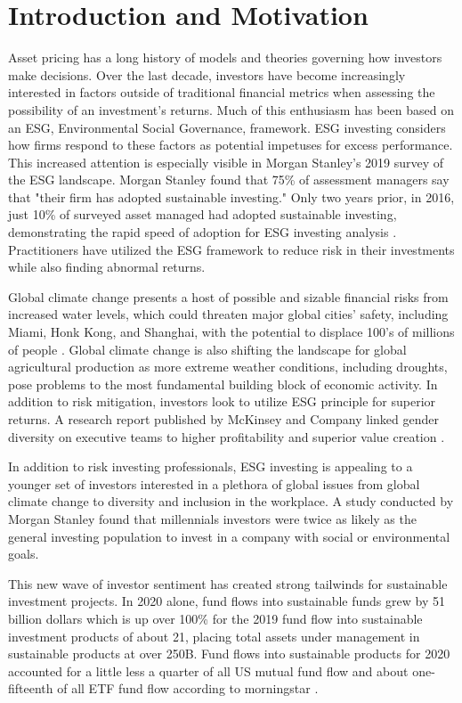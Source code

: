 \documentclass[12pt,oneside,reqno]{amsart}
\begin{document}
\section{Introduction and Motivation}
Asset pricing has a long history of models and theories governing how investors make decisions. Over the last decade, investors have become increasingly interested in factors outside of traditional financial metrics when assessing the possibility of an investment's returns. Much of this enthusiasm has been based on an ESG, Environmental Social Governance, framework. ESG investing considers how firms respond to these factors as potential impetuses for excess performance. This increased attention is especially visible in Morgan Stanley's 2019 survey of the ESG landscape. Morgan Stanley  found that 75\% of assessment managers say that "their firm has adopted sustainable investing." Only two years prior, in 2016, just 10\% of surveyed asset managed had adopted sustainable investing, demonstrating the rapid speed of adoption for ESG investing analysis \cite{morgan_stanley_sustainable_2019}. Practitioners have utilized the ESG framework to reduce risk in their investments while also finding abnormal returns.

Global climate change presents a host of possible and sizable financial risks from increased water levels, which could threaten major global cities' safety, including Miami, Honk Kong, and Shanghai, with the potential to displace 100's of millions of people \cite{holder_three-degree_nodate}. Global climate change is also shifting the landscape for global agricultural production as more extreme weather conditions, including droughts, pose problems to the most fundamental building block of economic activity. In addition to risk mitigation, investors look to utilize ESG principle for superior returns. A research report published by McKinsey and Company linked gender diversity on executive teams to higher profitability and superior value creation \cite{mckinsey_diversity}.

In addition to risk investing professionals, ESG investing is appealing to a younger set of investors interested in a plethora of global issues from global climate change to diversity and inclusion in the workplace. A study conducted by Morgan Stanley found that millennials investors were twice as likely as the general investing population to invest in a company with social or environmental goals.

This new wave of investor sentiment has created strong tailwinds for sustainable investment projects. In 2020 alone, fund flows into sustainable funds grew by 51 billion dollars which is up over 100\% for the 2019 fund flow into sustainable investment products of about 21, placing total assets under management in sustainable products at over 250B. Fund flows into sustainable products for 2020 accounted for a little less a quarter of all US mutual fund flow and about one-fifteenth of all ETF fund flow according to morningstar \cite{monring_star_ESG}.
\end{document}
